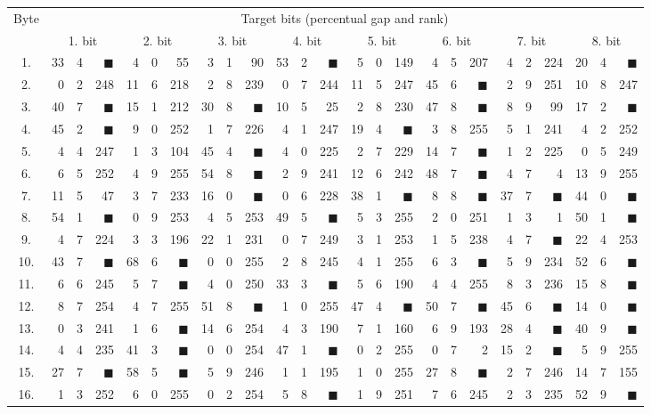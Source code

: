 \begin{tabular}{| c | r@{.} l@{\quad}r | r@{.} l@{\quad}r | r@{.} l@{\quad}r | r@{.} l@{\quad}r | r@{.} l@{\quad}r | r@{.} l@{\quad}r | r@{.} l@{\quad}r | r@{.} l@{\quad}r |}
	\hline
	\multirow{2}{*}{Byte} & \multicolumn{24}{c|}{Target bits (percentual gap and rank)} \\
	\cline{2-25}
	~ & \multicolumn{3}{c|}{1. bit} & \multicolumn{3}{c|}{2. bit} & \multicolumn{3}{c|}{3. bit} & \multicolumn{3}{c|}{4. bit} & \multicolumn{3}{c|}{5. bit} & \multicolumn{3}{c|}{6. bit} & \multicolumn{3}{c|}{7. bit} & \multicolumn{3}{c|}{8. bit} \\
	\hline
	\hline
	1.&33&4&{$\blacksquare$}&4&0&55&3&1&90&53&2&{$\blacksquare$}&5&0&149&4&5&207&4&2&224&20&4&{$\blacksquare$}\\
	\hline
	2.&0&2&248&11&6&218&2&8&239&0&7&244&11&5&247&45&6&{$\blacksquare$}&2&9&251&10&8&247\\
	\hline
	3.&40&7&{$\blacksquare$}&15&1&212&30&8&{$\blacksquare$}&10&5&25&2&8&230&47&8&{$\blacksquare$}&8&9&99&17&2&{$\blacksquare$}\\
	\hline
	4.&45&2&{$\blacksquare$}&9&0&252&1&7&226&4&1&247&19&4&{$\blacksquare$}&3&8&255&5&1&241&4&2&252\\
	\hline
	5.&4&4&247&1&3&104&45&4&{$\blacksquare$}&4&0&225&2&7&229&14&7&{$\blacksquare$}&1&2&225&0&5&249\\
	\hline
	6.&6&5&252&4&9&255&54&8&{$\blacksquare$}&2&9&241&12&6&242&48&7&{$\blacksquare$}&4&7&4&13&9&255\\
	\hline
	7.&11&5&47&3&7&233&16&0&{$\blacksquare$}&0&6&228&38&1&{$\blacksquare$}&8&8&{\weak$\blacksquare$}&37&7&{$\blacksquare$}&44&0&{$\blacksquare$}\\
	\hline
	8.&54&1&{$\blacksquare$}&0&9&253&4&5&253&49&5&{$\blacksquare$}&5&3&255&2&0&251&1&3&1&50&1&{$\blacksquare$}\\
	\hline
	9.&4&7&224&3&3&196&22&1&231&0&7&249&3&1&253&1&5&238&4&7&{\weak$\blacksquare$}&22&4&253\\
	\hline
	10.&43&7&{$\blacksquare$}&68&6&{$\blacksquare$}&0&0&255&2&8&245&4&1&255&6&3&{\weak$\blacksquare$}&5&9&234&52&6&{$\blacksquare$}\\
	\hline
	11.&6&6&245&5&7&{\weak$\blacksquare$}&4&0&250&33&3&{$\blacksquare$}&5&6&190&4&4&255&8&3&236&15&8&{$\blacksquare$}\\
	\hline
	12.&8&7&254&4&7&255&51&8&{$\blacksquare$}&1&0&255&47&4&{$\blacksquare$}&50&7&{$\blacksquare$}&45&6&{$\blacksquare$}&14&0&{$\blacksquare$}\\
	\hline
	13.&0&3&241&1&6&{\weak$\blacksquare$}&14&6&254&4&3&190&7&1&160&6&9&193&28&4&{$\blacksquare$}&40&9&{$\blacksquare$}\\
	\hline
	14.&4&4&235&41&3&{$\blacksquare$}&0&0&254&47&1&{$\blacksquare$}&0&2&255&0&7&2&15&2&{$\blacksquare$}&5&9&255\\
	\hline
	15.&27&7&{$\blacksquare$}&58&5&{$\blacksquare$}&5&9&246&1&1&195&1&0&255&27&8&{$\blacksquare$}&2&7&246&14&7&155\\
	\hline
	16.&1&3&252&6&0&255&0&2&254&5&8&{\weak$\blacksquare$}&1&9&251&7&6&245&2&3&235&52&9&{$\blacksquare$}\\
	\hline
\end{tabular}
